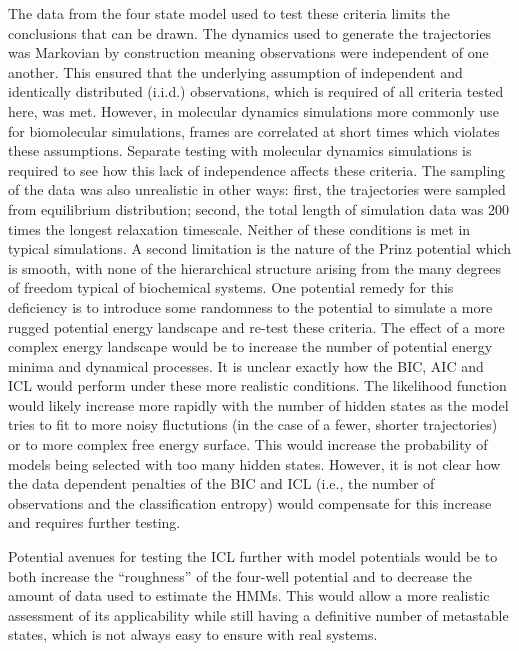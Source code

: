 The data from the four state model used to test these criteria limits the conclusions that can be drawn. The dynamics used to generate the trajectories was Markovian by construction meaning observations were independent of one another.  This ensured that the underlying assumption of independent and identically distributed  (i.i.d.) observations, which is required of all  criteria tested here, was met. However, in molecular dynamics simulations more commonly use for biomolecular simulations, frames are correlated at short times which violates these assumptions. Separate testing with molecular dynamics simulations is required to see how this lack of independence affects these criteria. The sampling of the data was also unrealistic in other ways: first, the trajectories were sampled from equilibrium distribution; second, the total length of simulation data was 200 times the longest relaxation timescale. Neither of these conditions is met in typical simulations.  A second limitation is the nature of the Prinz potential which is smooth, with none of the  hierarchical structure arising from the many degrees of freedom typical of biochemical systems. One potential remedy for this deficiency is to introduce some randomness to the potential to simulate a more rugged potential energy landscape and re-test these criteria.  The effect of a more complex energy landscape would be to increase the number of potential energy minima and dynamical processes. It is unclear exactly how the BIC, AIC and ICL would perform under these more realistic conditions.  The likelihood function would likely increase more rapidly with the number of hidden states as the model tries to fit to more noisy fluctutions (in the case of a fewer, shorter trajectories) or to more complex free energy surface. This would increase the probability of models being selected with too many hidden states. However, it is not clear how the data dependent penalties of the BIC and ICL (i.e., the number of observations and the classification entropy) would compensate for this increase and requires further testing. 

Potential avenues for testing the ICL further with model potentials would be to both increase the ``roughness'' of the four-well potential and to decrease the amount of data used to estimate the HMMs. This would allow a more realistic assessment of its applicability while still having a definitive number of metastable states, which is not always easy to ensure with real systems. 


